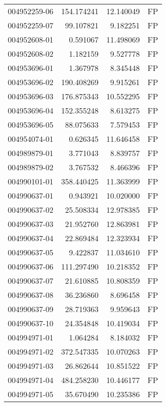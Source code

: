 \begin{tabular}{lrrl}
004952259-06 &  154.174241 &      12.140049 &   FP \\
004952259-07 &   99.107821 &       9.182251 &   FP \\
004952608-01 &    0.591067 &      11.498069 &   FP \\
004952608-02 &    1.182159 &       9.527778 &   FP \\
004953696-01 &    1.367978 &       8.345448 &   FP \\
004953696-02 &  190.408269 &       9.915261 &   FP \\
004953696-03 &  176.875343 &      10.552295 &   FP \\
004953696-04 &  152.355248 &       8.613275 &   FP \\
004953696-05 &   88.075633 &       7.579453 &   FP \\
004954074-01 &    0.626345 &      11.646458 &   FP \\
004989879-01 &    3.771043 &       8.839757 &   FP \\
004989879-02 &    3.767532 &       8.466396 &   FP \\
004990101-01 &  358.440425 &      11.363999 &   FP \\
004990637-01 &    0.943921 &      10.020000 &   FP \\
004990637-02 &   25.508334 &      12.978385 &   FP \\
004990637-03 &   21.952760 &      12.863981 &   FP \\
004990637-04 &   22.869484 &      12.323934 &   FP \\
004990637-05 &    9.422837 &      11.034610 &   FP \\
004990637-06 &  111.297490 &      10.218352 &   FP \\
004990637-07 &   21.610885 &      10.808359 &   FP \\
004990637-08 &   36.236860 &       8.696458 &   FP \\
004990637-09 &   28.719363 &       9.959643 &   FP \\
004990637-10 &   24.354848 &      10.419034 &   FP \\
004994971-01 &    1.064284 &       8.184032 &   FP \\
004994971-02 &  372.547335 &      10.070263 &   FP \\
004994971-03 &   26.862644 &      10.851522 &   FP \\
004994971-04 &  484.258230 &      10.446177 &   FP \\
004994971-05 &   35.670490 &      10.235386 &   FP \\

\end{tabular}
